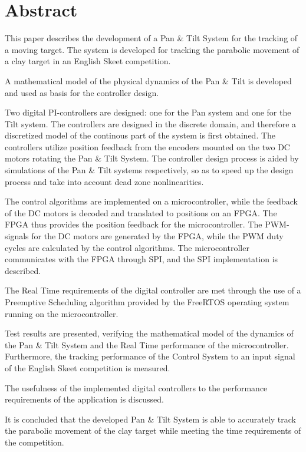 
\setcounter{page}{1}
\section*{Abstract}
This paper describes the development of a Pan \& Tilt System for the tracking of a moving
target. The system is developed for tracking the parabolic movement of
a clay target in an English Skeet competition.

A mathematical model of the physical dynamics of the Pan \& Tilt is
developed and used as basis for the controller design.

Two digital PI-controllers are designed: one for the Pan system and one for the Tilt system.
The controllers are designed in the discrete domain, and therefore a discretized model
of the continous part of the system is first obtained.
The controllers utilize position feedback from the encoders mounted on the two DC motors
rotating the Pan \& Tilt System.
The controller design process is aided by simulations of the Pan \& Tilt systems respectively,
so as to speed up the design process and take into account dead zone nonlinearities.

The control algorithms are implemented on a microcontroller, while
the feedback of the DC motors is decoded and translated to positions on an FPGA.
The FPGA thus provides the position feedback for the microcontroller.
The PWM-signals for the DC motors are generated by the FPGA, while the PWM duty cycles are calculated by the control algorithms.
The microcontroller communicates with the FPGA through SPI, and the SPI implementation is described.

The Real Time requirements of the digital controller are met through the use
of a Preemptive Scheduling algorithm provided by the FreeRTOS operating
system running on the microcontroller.

Test results are presented,
verifying the mathematical model of the dynamics of the Pan \& Tilt System
and the Real Time performance of the microcontroller.
Furthermore, the tracking performance of the Control System to an input signal
of the English Skeet competition is measured.

The usefulness of the implemented digital controllers to the performance requirements
of the application is discussed.

It is concluded that the developed Pan \& Tilt System
is able to accurately track the parabolic movement of the clay target while
meeting the time requirements of the competition.

